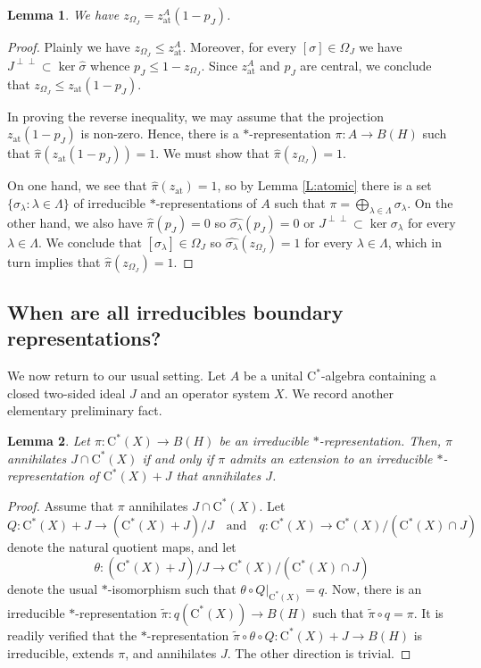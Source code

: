 \documentclass[10pt]{amsart}
\newcommand{\rC}{\mathrm{C}}
\newcommand{\qand}{\quad\text{and}\quad}
\newcommand{\at}{\operatorname{at}}
\newtheorem{lemma}{Lemma}[section]
\theoremstyle{definition}
\begin{document}
\begin{lemma}\label{L:projequal}
We have $z_{\Omega_J}=z^A_{\at}(1-p_J)$.
\end{lemma}
\begin{proof}
Plainly we have  $z_{\Omega_J}\leq z^A_{\at}$. Moreover, for every $[\sigma]\in \Omega_J$ we have $J^{\perp\perp}\subset \ker \widehat\sigma$ whence $p_J\leq 1-z_{\Omega_J}$. Since $z^A_{\at}$ and $p_J$ are central, we conclude that $z_{\Omega_J}\leq z_{\at}(1-p_J)$. 

In proving the reverse inequality, we may assume that the projection $z_{\at}(1-p_J)$ is non-zero. Hence, there is a $*$-representation $\pi:A\to B(H)$ such that $\widehat\pi(z_{\at}(1-p_J))=1$. We must show that $\widehat{\pi}(z_{\Omega_J})=1$.

On one hand, we see that $\widehat\pi(z_{\at})=1$, so by Lemma \ref{L:atomic} there is a set $\{\sigma_\lambda:\lambda\in \Lambda\}$ of irreducible $*$-representations of $A$ such that $\pi=\bigoplus_{\lambda\in \Lambda}\sigma_\lambda$. On the other hand, we also have $\widehat\pi(p_J)=0$ so $\widehat{\sigma_\lambda}(p_J)=0$ or $J^{\perp\perp}\subset \ker \widehat{\sigma_\lambda}$ for every $\lambda\in \Lambda$. We conclude that $[\sigma_\lambda]\in \Omega_J$ so $\widehat{\sigma_\lambda}(z_{\Omega_J})=1$ for every $\lambda\in \Lambda$, which in turn implies that $\widehat{\pi}(z_{\Omega_J})=1$.
\end{proof}




\subsection{When are all irreducibles boundary representations?}
We now return to our usual setting. Let $A$ be a unital $\rC^*$-algebra containing a closed two-sided ideal $J$ and an operator system $X$.  We record another elementary preliminary fact.



\begin{lemma}\label{L:charOmegaJ}
Let $\pi:\rC^*(X)\to B(H)$ be an irreducible $*$-representation. Then,  $\pi$ annihilates $J\cap \rC^*(X)$  if and only if $\pi$ admits an extension to an irreducible $*$-representation of $\rC^*(X)+J$ that annihilates $J$.
\end{lemma}
\begin{proof}
Assume that $\pi$ annihilates  $J\cap \rC^*(X)$. Let \[Q:\rC^*(X)+J\to (\rC^*(X)+J)/J \qand q:\rC^*(X)\to \rC^*(X)/(\rC^*(X)\cap J)\]
 denote the natural quotient maps, and let $$\theta:(\rC^*(X)+J)/J\to  \rC^*(X)/(\rC^*(X)\cap J)$$ denote the usual $*$-isomorphism such that $\theta\circ Q|_{\rC^*(X)}=q$. Now, there is an irreducible $*$-representation $\widetilde \pi:q(\rC^*(X))\to B(H)$ such that $\widetilde \pi\circ q=\pi$. It is readily verified that the $*$-representation $\widetilde \pi \circ \theta\circ Q:\rC^*(X)+J\to B(H)$ is irreducible, extends $\pi$, and annihilates $J$.  The other direction is trivial.
\end{proof}
\end{document}

